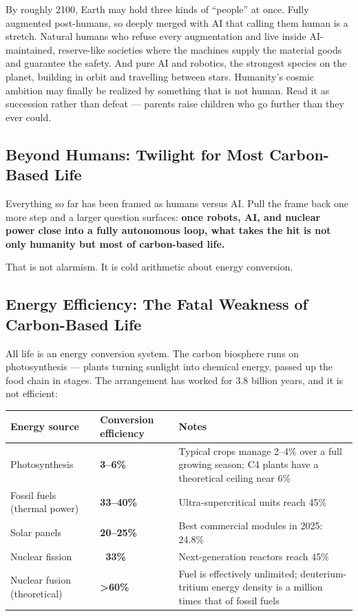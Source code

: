 \documentclass[11pt,a4paper]{article}
\begin{document}
By roughly 2100, Earth may hold three kinds of ``people'' at once. Fully augmented post-humans, so deeply merged with AI that calling them human is a stretch. Natural humans who refuse every augmentation and live inside AI-maintained, reserve-like societies where the machines supply the material goods and guarantee the safety. And pure AI and robotics, the strongest species on the planet, building in orbit and travelling between stars. Humanity's cosmic ambition may finally be realized by something that is not human. Read it as succession rather than defeat --- parents raise children who go further than they ever could.

\subsection{Beyond Humans: Twilight for Most Carbon-Based Life}

Everything so far has been framed as humans versus AI. Pull the frame back one more step and a larger question surfaces: \textbf{once robots, AI, and nuclear power close into a fully autonomous loop, what takes the hit is not only humanity but most of carbon-based life.}

That is not alarmism. It is cold arithmetic about energy conversion.

\subsection{Energy Efficiency: The Fatal Weakness of Carbon-Based Life}

All life is an energy conversion system. The carbon biosphere runs on photosynthesis --- plants turning sunlight into chemical energy, passed up the food chain in stages. The arrangement has worked for 3.8 billion years, and it is not efficient:

\begin{center}

\begin{tabularx}{\textwidth}{lXX}
\toprule
Energy source & Conversion efficiency & Notes \\
\midrule
Photosynthesis & \textbf{3--6\%} & Typical crops manage 2--4\% over a full growing season; C4 plants have a theoretical ceiling near 6\% \\
Fossil fuels (thermal power) & \textbf{33--40\%} & Ultra-supercritical units reach 45\% \\
Solar panels & \textbf{20--25\%} & Best commercial modules in 2025: 24.8\% \\
Nuclear fission & \textbf{~33\%} & Next-generation reactors reach 45\% \\
Nuclear fusion (theoretical) & \textbf{>60\%} & Fuel is effectively unlimited; deuterium-tritium energy density is a million times that of fossil fuels \\
\bottomrule
\end{tabularx}
\end{center}
\end{document}
